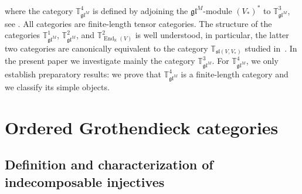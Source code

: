 \documentclass[11pt]{article}
\theoremstyle{plain}
\theoremstyle{nonumberplain}
\theoremstyle{plain}
\theoremstyle{nonumberplain}
\newcommand\bK{{\mathbb K}}
\newcommand\bT{{\mathbb T}}
\newcommand\fgl{\mathfrak{gl}}
\newcommand\fsl{\mathfrak{sl}}
\DeclareMathOperator{\End}{\mathrm{End}}
\begin{document}
%
%
%
%
where the category $\bT^4_{\fgl^M}$ is defined by adjoining the $\fgl^M$-module $\left(V_*\right)^*$ to $\bT^3_{\fgl^M}$, see .  All categories  are finite-length tensor categories.  The structure of the categories $\bT^1_{\fgl^M}$, $\bT^2_{\fgl^M}$, and $\bT^2_{\End_\bK(V)}$ is well understood, in particular, the latter two categories are canonically equivalent to the category $\bT_{\fsl\left(V,V_*\right)}$ studied in~\cite{DPS,SS}.  In the present paper we investigate mainly the category $\bT^3_{\fgl^M}$.  %
For $\bT^4_{\fgl^M}$, we only establish preparatory results: we prove that $\bT^4_{\fgl^M}$ is a finite-length category and we classify its simple objects.







\section{Ordered Grothendieck categories%
}\label{se.inj}

\subsection{Definition and characterization of indecomposable injectives}
\label{subse.indinj}

\end{document}
